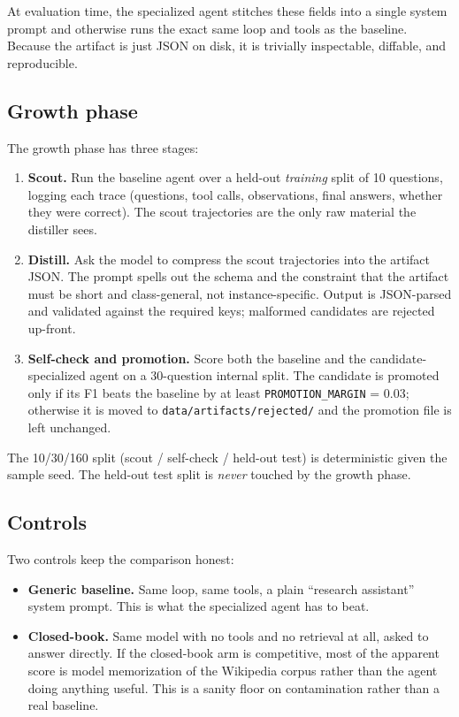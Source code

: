 \documentclass[11pt,a4paper]{article}
\begin{document}
At evaluation time, the specialized agent stitches these fields into a
single system prompt and otherwise runs the exact same loop and tools as
the baseline. Because the artifact is just JSON on disk, it is trivially
inspectable, diffable, and reproducible.

\subsection{Growth phase}

The growth phase has three stages:

\begin{enumerate}[leftmargin=*]
    \item \textbf{Scout.} Run the baseline agent over a held-out
          \emph{training} split of 10 questions, logging each trace
          (questions, tool calls, observations, final answers, whether
          they were correct). The scout trajectories are the only raw
          material the distiller sees.
    \item \textbf{Distill.} Ask the model to compress the scout
          trajectories into the artifact JSON. The prompt spells out the
          schema and the constraint that the artifact must be short and
          class-general, not instance-specific. Output is JSON-parsed
          and validated against the required keys; malformed candidates
          are rejected up-front.
    \item \textbf{Self-check and promotion.} Score both the baseline and
          the candidate-specialized agent on a 30-question internal
          split. The candidate is promoted only if its F1 beats the
          baseline by at least \texttt{PROMOTION\_MARGIN} = 0.03;
          otherwise it is moved to \texttt{data/artifacts/rejected/}
          and the promotion file is left unchanged.
\end{enumerate}

The 10/30/160 split (scout / self-check / held-out test) is deterministic
given the sample seed. The held-out test split is \emph{never} touched by
the growth phase.

\subsection{Controls}

Two controls keep the comparison honest:

\begin{itemize}[leftmargin=*]
    \item \textbf{Generic baseline.} Same loop, same tools, a plain
          ``research assistant'' system prompt. This is what the
          specialized agent has to beat.
    \item \textbf{Closed-book.} Same model with no tools and no retrieval
          at all, asked to answer directly. If the closed-book arm is
          competitive, most of the apparent score is model memorization
          of the Wikipedia corpus rather than the agent doing anything
          useful. This is a sanity floor on contamination rather than a
          real baseline.
\end{itemize}
\end{document}
